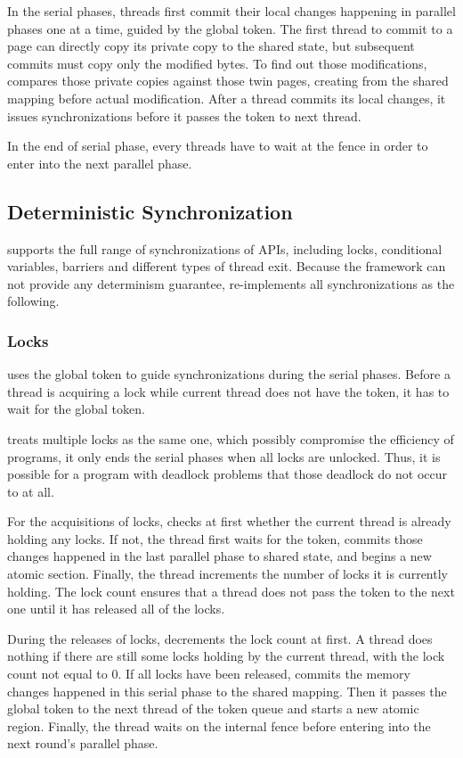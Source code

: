 In the serial phases, threads first commit their local changes happening in parallel phases one at a time, guided by the global token.  The first thread to commit to a page can directly copy its private copy to the shared state, but subsequent commits must copy only the modified bytes. To find out those modifications, \dthreads{} compares those private copies against those twin pages, creating from the shared mapping before actual modification.  After a thread commits its local changes, it issues synchronizations before it passes the token to next thread. 

In the end of serial phase, every threads have to wait at the fence in order to enter into the next parallel phase. 

\subsection{Deterministic Synchronization}
\label{sec:synchronization}
\dthreads{} supports the full range of synchronizations of
\pthreads{} APIs, including locks, conditional variables, barriers and different types of thread exit. Because the \sheriff{} framework can not provide any determinism guarantee, \dthreads{} re-implements all synchronizations as the following.

\subsubsection{Locks}
\dthreads{} uses the global token to guide synchronizations during the serial phases. Before a thread is acquiring a lock while current thread does not have the token, it has to wait for the global token. 

\dthreads{} treats multiple locks as the same one, which  possibly compromise the efficiency of programs, it only ends the serial phases when all locks are unlocked. Thus, it is possible for a program with deadlock problems that those deadlock do not occur to \dthreads{} at all. 

For the acquisitions of locks, \dthreads{} checks at first 
whether the current thread is already holding any locks. If not, the thread first waits for the token, commits those changes happened in the last parallel phase to shared state, and begins a new atomic section. Finally, the thread increments the number of locks it is currently holding. The lock count ensures that a thread does not pass the token to the next one until it has released all of the locks.

During the releases of locks, \dthreads{} decrements the lock count at first. A thread does nothing if there are still some locks holding by the current thread, with the lock count not equal to 0. If all locks have been released, \dthreads{} commits the memory changes happened in this serial phase to the shared mapping. Then it passes the global token to the next thread of the token queue and starts a new atomic region. Finally, the thread waits on the internal fence before entering into the next round's parallel phase.

